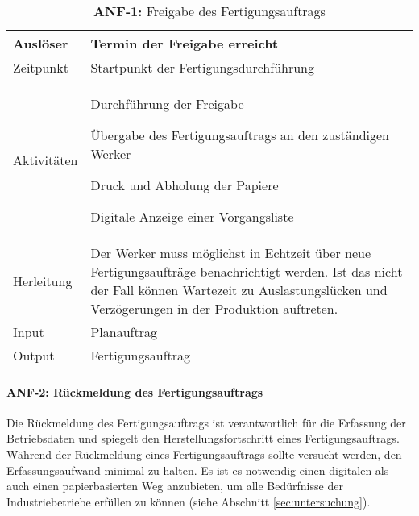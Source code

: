 \begin{table}[H]
	\centering
	\begin{tabularx}{\textwidth}{|l|X|} 
		\hline
		Auslöser                                     &   
		Termin der Freigabe erreicht \\ 
		\hline\hline
		Zeitpunkt                                     &   
		Startpunkt der Fertigungsdurchführung \\ 
		\hline\hline
		Aktivitäten &   
		\begin{minipage}{4.8in}
    		\begin{compactenum} 
        		\renewcommand{\labelenumi}{(\arabic{enumi})}
        		\item Durchführung der Freigabe
        		\item Übergabe des Fertigungsauftrags an den zuständigen Werker
            		\begin{compactenum} 
            		\renewcommand{\labelenumi}{(\arabic{enumi})}
            		\item Druck und Abholung der Papiere
            		\item Digitale Anzeige einer Vorgangsliste
            		\end{compactenum}
    		\end{compactenum}
    		\vspace{1pt}		
		\end{minipage} \\
		\hline\hline
		Herleitung                                        &   
		Der Werker muss möglichst in Echtzeit über neue Fertigungsaufträge benachrichtigt werden. 
		Ist das nicht der Fall können Wartezeit zu Auslastungslücken und Verzögerungen in der Produktion auftreten.\\
		\hline\hline
		Input                                         &   
		Planauftrag  \\ 
		\hline\hline
		Output                                        &   
		Fertigungsauftrag \\
		\hline
	\end{tabularx}
	\caption{\label{tab:anf1}\textbf{ANF-1:} Freigabe des Fertigungsauftrags}
\end{table}



\paragraph{ANF-2: Rückmeldung des Fertigungsauftrags}
Die Rückmeldung des Fertigungsauftrags ist verantwortlich für die Erfassung der Betriebsdaten und spiegelt den Herstellungsfortschritt eines Fertigungsauftrags. 
Während der Rückmeldung eines Fertigungsauftrags sollte versucht werden, den Erfassungsaufwand minimal zu halten. Es ist es notwendig einen digitalen als auch einen papierbasierten Weg anzubieten, um alle Bedürfnisse der Industriebetriebe erfüllen zu können (siehe Abschnitt \ref{sec:untersuchung}). 

